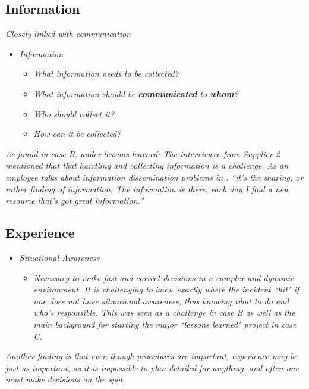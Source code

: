 \subsection{Information}
\textit{Closely linked with communication}

\begin{itemize}
\item \textit{Information}
\begin{itemize}
\item \textit{What information needs to be collected?}
\item \textit{What information should be \textbf{communicated} to \textbf{whom}?}
\item \textit{Who should collect it?}
\item \textit{How can it be collected?}
\end{itemize}
\end{itemize}

\textit{As found in case B, under lessons learned:
The interviewee from Supplier 2 mentioned that that handling and collecting information is a challenge. As an employee talks about information dissemination problems in \cite{ahmad2012incident}.
``it's the sharing, or rather finding of information. The information is there, each day I find a new resource that's got great information."}

\subsection{Experience}

\begin{itemize}
\item \textit{Situational Awareness}
\begin{itemize}
\item\textit{ Necessary to make fast and correct decisions in a complex and dynamic environment. It is challenging to know exactly where the incident ``hit" if one does not have situational awareness, thus knowing what to do and who's responsible. This was  seen as a challenge in case B as well as the main background for starting the major ``lessons learned" project in case C.}
\end{itemize}
\end{itemize}

\textit{Another finding is that even though procedures are important, experience may be just as important, as it is impossible to plan detailed for anything, and often one must make decisions on the spot.}

